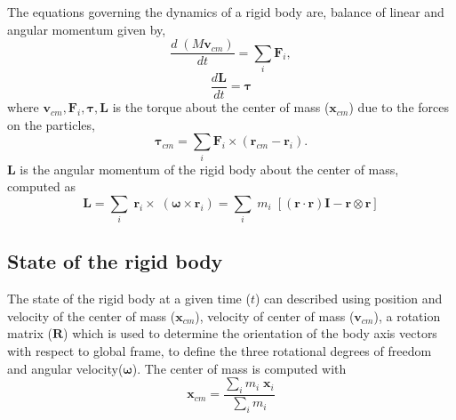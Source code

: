 \documentclass[preprint,12pt]{elsarticle}
\newcommand{\teng}[1]{\ensuremath{\boldsymbol{#1}}}
\newcommand{\ten}[1]{\ensuremath{\mathbf{#1}}}
\begin{document}
The equations governing the dynamics of a rigid body are, balance of linear and
angular momentum given by,
\begin{equation}
  \label{eq:balance_linear_mom}
  \frac{d \; (M \ten{v}_{cm})}{d t} = \sum_i \ten{F}_i,
\end{equation}
\begin{equation}
  \label{eq:balance_angular_mom}
  \frac{d \ten{L}}{d t} = \teng{\tau}
\end{equation}
where $\ten{v}_{cm}, \ten{F}_i, \teng{\tau}, \ten{L} $ is the torque about the center of mass
($\ten{x}_{cm}$) due to the forces on the particles,
\begin{equation}
  \label{eq:torque}
  \teng{\tau}_{cm} = \sum_i \ten{F}_i \times (\ten{r}_{cm} - \ten{r}_{i}).
\end{equation}
$\ten{L}$ is the angular momentum of the rigid body about the center of mass,
computed as
\begin{equation}
  \label{eq:moi}
  \teng{L} =
  \sum_i \; \ten{r}_i \times \; (\teng{\omega} \times \ten{r}_i)
  = \sum_i \; m_i \; [(\ten{r} \cdot \ten{r}) \ten{I} - \ten{r} \otimes \ten{r}]
\end{equation}





\subsection{State of the rigid body}

The state of the rigid body at a given time ($t$) can described using position
and velocity of the center of mass ($\ten{x}_{cm}$), velocity of center of
mass ($\ten{v}_{cm}$), a rotation matrix ($\ten{R}$) which is used to
determine the orientation of the body axis vectors with respect to global
frame, to define the three rotational degrees of freedom and angular
velocity($\teng{\omega}$). The center of mass is computed with
\begin{equation}
  \label{eq:center_of_mass}
  \ten{x}_{cm} = \frac{\sum_i m_i \; \ten{x}_{i} }{\sum_i m_i }
\end{equation}
\end{document}
